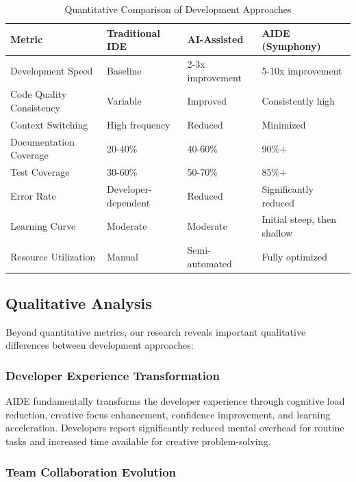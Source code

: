 \begin{table}[ht]
\centering
\begin{tabular}{@{}llll@{}}
\toprule
\textbf{Metric} & \textbf{Traditional IDE} & \textbf{AI-Assisted} & \textbf{AIDE (Symphony)} \\
\midrule
Development Speed & Baseline & 2-3x improvement & 5-10x improvement \\
Code Quality Consistency & Variable & Improved & Consistently high \\
Context Switching & High frequency & Reduced & Minimized \\
Documentation Coverage & 20-40\% & 40-60\% & 90\%+ \\
Test Coverage & 30-60\% & 50-70\% & 85\%+ \\
Error Rate & Developer-dependent & Reduced & Significantly reduced \\
Learning Curve & Moderate & Moderate & Initial steep, then shallow \\
Resource Utilization & Manual & Semi-automated & Fully optimized \\
\bottomrule
\end{tabular}
\caption{Quantitative Comparison of Development Approaches}
\label{tab:quantitative-comparison}
\end{table}

\subsection{Qualitative Analysis}

Beyond quantitative metrics, our research reveals important qualitative differences between development approaches:

\subsubsection{Developer Experience Transformation}

AIDE fundamentally transforms the developer experience through cognitive load reduction, creative focus enhancement, confidence improvement, and learning acceleration. Developers report significantly reduced mental overhead for routine tasks and increased time available for creative problem-solving.

\subsubsection{Team Collaboration Evolution}

